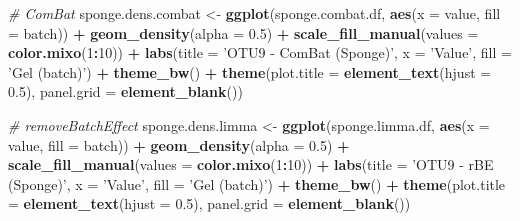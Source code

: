 \documentclass[]{book}
\newenvironment{Shaded}{\begin{snugshade}}{\end{snugshade}}
\newcommand{\KeywordTok}[1]{\textcolor[rgb]{0.13,0.29,0.53}{\textbf{#1}}}
\newcommand{\DataTypeTok}[1]{\textcolor[rgb]{0.13,0.29,0.53}{#1}}
\newcommand{\DecValTok}[1]{\textcolor[rgb]{0.00,0.00,0.81}{#1}}
\newcommand{\FloatTok}[1]{\textcolor[rgb]{0.00,0.00,0.81}{#1}}
\newcommand{\StringTok}[1]{\textcolor[rgb]{0.31,0.60,0.02}{#1}}
\newcommand{\CommentTok}[1]{\textcolor[rgb]{0.56,0.35,0.01}{\textit{#1}}}
\newcommand{\OperatorTok}[1]{\textcolor[rgb]{0.81,0.36,0.00}{\textbf{#1}}}
\newcommand{\NormalTok}[1]{#1}
\begin{document}
\begin{Shaded}
\begin{Highlighting}[]
\CommentTok{# ComBat}
\NormalTok{sponge.dens.combat <-}\StringTok{ }\KeywordTok{ggplot}\NormalTok{(sponge.combat.df, }\KeywordTok{aes}\NormalTok{(}\DataTypeTok{x =}\NormalTok{ value, }\DataTypeTok{fill =}\NormalTok{ batch)) }\OperatorTok{+}\StringTok{ }
\StringTok{  }\KeywordTok{geom_density}\NormalTok{(}\DataTypeTok{alpha =} \FloatTok{0.5}\NormalTok{) }\OperatorTok{+}\StringTok{ }\KeywordTok{scale_fill_manual}\NormalTok{(}\DataTypeTok{values =} \KeywordTok{color.mixo}\NormalTok{(}\DecValTok{1}\OperatorTok{:}\DecValTok{10}\NormalTok{)) }\OperatorTok{+}\StringTok{ }
\StringTok{  }\KeywordTok{labs}\NormalTok{(}\DataTypeTok{title =} \StringTok{'OTU9 - ComBat (Sponge)'}\NormalTok{, }\DataTypeTok{x =} \StringTok{'Value'}\NormalTok{, }\DataTypeTok{fill =} \StringTok{'Gel (batch)'}\NormalTok{) }\OperatorTok{+}\StringTok{ }
\StringTok{  }\KeywordTok{theme_bw}\NormalTok{() }\OperatorTok{+}\StringTok{ }\KeywordTok{theme}\NormalTok{(}\DataTypeTok{plot.title =} \KeywordTok{element_text}\NormalTok{(}\DataTypeTok{hjust =} \FloatTok{0.5}\NormalTok{), }
                     \DataTypeTok{panel.grid =} \KeywordTok{element_blank}\NormalTok{())}


\CommentTok{# removeBatchEffect }
\NormalTok{sponge.dens.limma <-}\StringTok{ }\KeywordTok{ggplot}\NormalTok{(sponge.limma.df, }\KeywordTok{aes}\NormalTok{(}\DataTypeTok{x =}\NormalTok{ value, }\DataTypeTok{fill =}\NormalTok{ batch)) }\OperatorTok{+}\StringTok{ }
\StringTok{  }\KeywordTok{geom_density}\NormalTok{(}\DataTypeTok{alpha =} \FloatTok{0.5}\NormalTok{) }\OperatorTok{+}\StringTok{ }\KeywordTok{scale_fill_manual}\NormalTok{(}\DataTypeTok{values =} \KeywordTok{color.mixo}\NormalTok{(}\DecValTok{1}\OperatorTok{:}\DecValTok{10}\NormalTok{)) }\OperatorTok{+}\StringTok{ }
\StringTok{  }\KeywordTok{labs}\NormalTok{(}\DataTypeTok{title =} \StringTok{'OTU9 - rBE (Sponge)'}\NormalTok{, }\DataTypeTok{x =} \StringTok{'Value'}\NormalTok{, }\DataTypeTok{fill =} \StringTok{'Gel (batch)'}\NormalTok{) }\OperatorTok{+}\StringTok{ }
\StringTok{  }\KeywordTok{theme_bw}\NormalTok{() }\OperatorTok{+}\StringTok{ }\KeywordTok{theme}\NormalTok{(}\DataTypeTok{plot.title =} \KeywordTok{element_text}\NormalTok{(}\DataTypeTok{hjust =} \FloatTok{0.5}\NormalTok{), }
                     \DataTypeTok{panel.grid =} \KeywordTok{element_blank}\NormalTok{())}



\end{Highlighting}
\end{Shaded}
\end{document}
